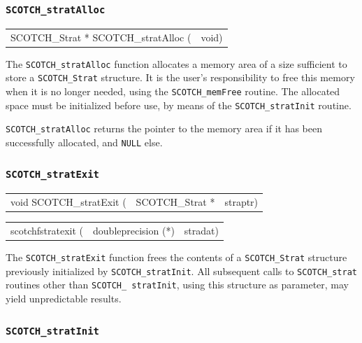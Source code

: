 \subsubsection{{\tt SCOTCH\_stratAlloc}}

\begin{itemize}
\progsyn

{\tt\begin{tabular}{l@{}l}
SCOTCH\_Strat * SCOTCH\_stratAlloc ( & void)
\end{tabular}}

\progdes

The {\tt SCOTCH\_stratAlloc} function allocates a memory area of a
size sufficient to store a {\tt SCOTCH\_\lbt Strat} structure. It is
the user's responsibility to free this memory when it is no longer
needed, using the {\tt SCOTCH\_\lbt mem\lbt Free} routine. The
allocated space must be initialized before use, by means of the
{\tt SCOTCH\_\lbt strat\lbt Init} routine.

\progret

{\tt SCOTCH\_stratAlloc} returns the pointer to the memory area if it
has been successfully allocated, and {\tt NULL} else.
\end{itemize}

\subsubsection{{\tt SCOTCH\_stratExit}}

\begin{itemize}
\progsyn

{\tt\begin{tabular}{l@{}ll}
void SCOTCH\_stratExit ( & SCOTCH\_Strat * & straptr)
\end{tabular}}

{\tt\begin{tabular}{l@{}ll}
scotchfstratexit ( & doubleprecision (*) & stradat)
\end{tabular}}

\progdes

The {\tt SCOTCH\_stratExit} function frees the contents of a
{\tt SCOTCH\_\lbt Strat} structure previously initialized by
{\tt SCOTCH\_\lbt strat\lbt Init}. All subsequent calls to
{\tt SCOTCH\_\lbt strat} routines other than {\tt SCOTCH\_\lbt
strat\lbt Init}, using this structure as parameter, may yield
unpredictable results.
\end{itemize}

\subsubsection{{\tt SCOTCH\_stratInit}}

